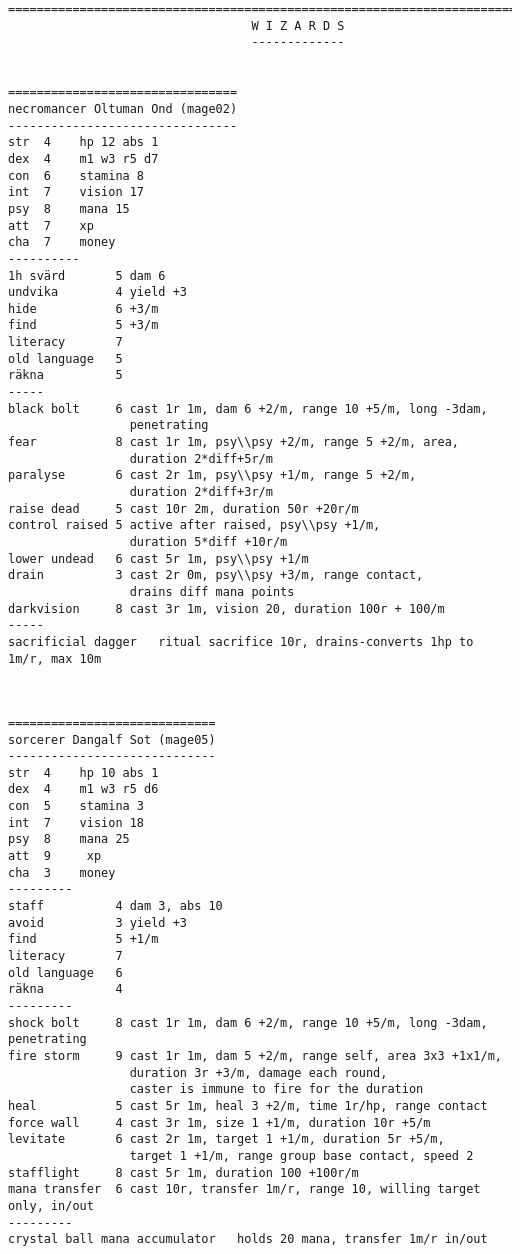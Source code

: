 \goodbreak
\tiny \begin{samepage} \begin{verbatim}
================================================================================
                                  W I Z A R D S
                                  -------------


================================
necromancer Oltuman Ond (mage02)
--------------------------------
str  4    hp 12 abs 1
dex  4    m1 w3 r5 d7
con  6    stamina 8
int  7    vision 17
psy  8    mana 15
att  7    xp
cha  7    money
----------
1h svärd       5 dam 6
undvika        4 yield +3
hide           6 +3/m
find           5 +3/m
literacy       7
old language   5
räkna          5
-----
black bolt     6 cast 1r 1m, dam 6 +2/m, range 10 +5/m, long -3dam,
                 penetrating
fear           8 cast 1r 1m, psy\\psy +2/m, range 5 +2/m, area,
                 duration 2*diff+5r/m
paralyse       6 cast 2r 1m, psy\\psy +1/m, range 5 +2/m,
                 duration 2*diff+3r/m
raise dead     5 cast 10r 2m, duration 50r +20r/m
control raised 5 active after raised, psy\\psy +1/m,
                 duration 5*diff +10r/m
lower undead   6 cast 5r 1m, psy\\psy +1/m
drain          3 cast 2r 0m, psy\\psy +3/m, range contact,
                 drains diff mana points
darkvision     8 cast 3r 1m, vision 20, duration 100r + 100/m
-----
sacrificial dagger   ritual sacrifice 10r, drains-converts 1hp to 1m/r, max 10m
\end{verbatim} \end{samepage} \normalsize


\

\goodbreak
\tiny \begin{samepage} \begin{verbatim}
=============================
sorcerer Dangalf Sot (mage05)
-----------------------------
str  4    hp 10 abs 1
dex  4    m1 w3 r5 d6
con  5    stamina 3
int  7    vision 18
psy  8    mana 25
att  9     xp
cha  3    money
---------
staff          4 dam 3, abs 10
avoid          3 yield +3
find           5 +1/m
literacy       7
old language   6
räkna          4
---------
shock bolt     8 cast 1r 1m, dam 6 +2/m, range 10 +5/m, long -3dam, penetrating
fire storm     9 cast 1r 1m, dam 5 +2/m, range self, area 3x3 +1x1/m,
                 duration 3r +3/m, damage each round,
                 caster is immune to fire for the duration
heal           5 cast 5r 1m, heal 3 +2/m, time 1r/hp, range contact
force wall     4 cast 3r 1m, size 1 +1/m, duration 10r +5/m
levitate       6 cast 2r 1m, target 1 +1/m, duration 5r +5/m,
                 target 1 +1/m, range group base contact, speed 2
stafflight     8 cast 5r 1m, duration 100 +100r/m
mana transfer  6 cast 10r, transfer 1m/r, range 10, willing target only, in/out
---------
crystal ball mana accumulator   holds 20 mana, transfer 1m/r in/out
\end{verbatim} \end{samepage} \normalsize


